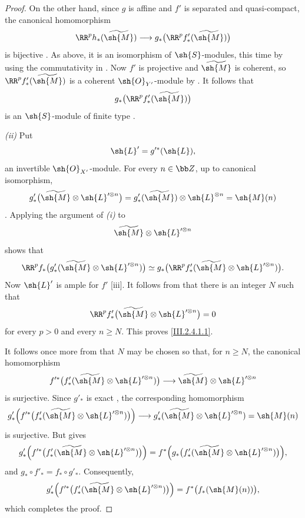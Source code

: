 \begin{proof}
On the other hand, since $g$ is affine and $f'$ is separated and quasi-compact, the canonical homomorphism
\[
  \RR^p h_*(\widetilde{\sh{M}})
  \longrightarrow
  g_*\bigl(\RR^p f'_*(\widetilde{\sh{M}})\bigr)
\]
is bijective .
As above, it is an isomorphism of $\sh{S}$-modules, this time by using the commutativity in .
Now $f'$ is projective and $\widetilde{\sh{M}}$ is coherent, so $\RR^p f'_*(\widetilde{\sh{M}})$ is a coherent $\sh{O}_{Y'}$-module by .
It follows that
\[
  g_*\bigl(\RR^p f'_*(\widetilde{\sh{M}})\bigr)
\]
is an $\sh{S}$-module of finite type .

\emph{(ii)} Put
\[
  \sh{L}'=g'^*(\sh{L}),
\]
an invertible $\sh{O}_{X'}$-module.
For every $n\in\bb Z$, up to canonical isomorphism,
\[
  g'_*\bigl(\widetilde{\sh{M}}\otimes\sh{L}'^{\otimes n}\bigr)
  =
  g'_*(\widetilde{\sh{M}})\otimes\sh{L}^{\otimes n}
  =
  \sh{M}(n)
\]
.
Applying the argument of \emph{(i)} to
\[
  \widetilde{\sh{M}}\otimes\sh{L}'^{\otimes n}
\]
shows that
\[
  \RR^p f_*
  \bigl(g'_*(\widetilde{\sh{M}}\otimes\sh{L}'^{\otimes n})\bigr)
  \simeq
  g_*\bigl(\RR^p f'_*
  (\widetilde{\sh{M}}\otimes\sh{L}'^{\otimes n})\bigr).
\]
Now $\sh{L}'$ is ample for $f'$ [iii].
It follows from  that there is an integer $N$ such that
\[
  \RR^p f'_*
  \bigl(\widetilde{\sh{M}}\otimes\sh{L}'^{\otimes n}\bigr)=0
\]
for every $p>0$ and every $n\geq N$.
This proves \eqref{III.2.4.1.1}.

It follows once more from  that $N$ may be chosen so that, for $n\geq N$, the canonical homomorphism
\[
  f'^*\bigl(f'_*(\widetilde{\sh{M}}\otimes\sh{L}'^{\otimes n})\bigr)
  \longrightarrow
  \widetilde{\sh{M}}\otimes\sh{L}'^{\otimes n}
\]
is surjective.
Since $g'_*$ is exact , the corresponding homomorphism
\[
  g'_*\Bigl(
    f'^*\bigl(f'_*(\widetilde{\sh{M}}\otimes\sh{L}'^{\otimes n})\bigr)
  \Bigr)
  \longrightarrow
  g'_*(\widetilde{\sh{M}}\otimes\sh{L}'^{\otimes n})
  =\sh{M}(n)
\]
is surjective.
But  gives
\[
  g'_*\Bigl(
    f'^*\bigl(f'_*(\widetilde{\sh{M}}\otimes\sh{L}'^{\otimes n})\bigr)
  \Bigr)
  =
  f^*\Bigl(
    g_*\bigl(f'_*(\widetilde{\sh{M}}\otimes\sh{L}'^{\otimes n})\bigr)
  \Bigr),
\]
and $g_*\circ f'_*=f_*\circ g'_*$.
Consequently,
\[
  g'_*\Bigl(
    f'^*\bigl(f'_*(\widetilde{\sh{M}}\otimes\sh{L}'^{\otimes n})\bigr)
  \Bigr)
  =
  f^*\bigl(f_*(\sh{M}(n))\bigr),
\]
which completes the proof.
\end{proof}

